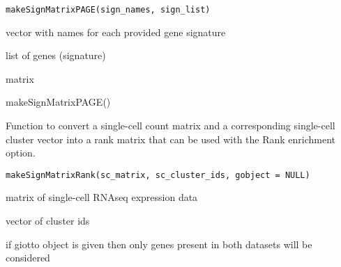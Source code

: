 \documentclass[a4paper]{book}
\begin{document}
%
\begin{Usage}
\begin{verbatim}
makeSignMatrixPAGE(sign_names, sign_list)
\end{verbatim}
\end{Usage}
%
\begin{Arguments}
\begin{ldescription}
\item[\code{sign\_names}] vector with names for each provided gene signature

\item[\code{sign\_list}] list of genes (signature)
\end{ldescription}
\end{Arguments}
%
\begin{Value}
matrix
\end{Value}
%
\begin{SeeAlso}\relax
{}
\end{SeeAlso}
%
\begin{Examples}
\begin{ExampleCode}
    makeSignMatrixPAGE()
\end{ExampleCode}
\end{Examples}
%
\begin{Description}\relax
Function to convert a single-cell count matrix
and a corresponding single-cell cluster vector into
a rank matrix that can be used with the Rank enrichment option.
\end{Description}
%
\begin{Usage}
\begin{verbatim}
makeSignMatrixRank(sc_matrix, sc_cluster_ids, gobject = NULL)
\end{verbatim}
\end{Usage}
%
\begin{Arguments}
\begin{ldescription}
\item[\code{sc\_matrix}] matrix of single-cell RNAseq expression data

\item[\code{sc\_cluster\_ids}] vector of cluster ids

\item[\code{gobject}] if giotto object is given then only genes present in both datasets will be considered
\end{ldescription}
\end{Arguments}
\end{document}
